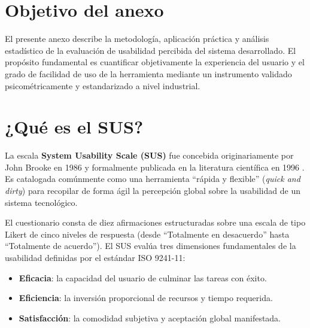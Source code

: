

\section{Objetivo del anexo}
El presente anexo describe la metodología, aplicación práctica y análisis estadístico de la evaluación de usabilidad percibida del sistema desarrollado. El propósito fundamental es cuantificar objetivamente la experiencia del usuario y el grado de facilidad de uso de la herramienta mediante un instrumento validado psicométricamente y estandarizado a nivel industrial.

\section{¿Qué es el SUS?}
La escala \textbf{System Usability Scale (SUS)} fue concebida originariamente por John Brooke en 1986 y formalmente publicada en la literatura científica en 1996 \parencite{Brooke1996}. Es catalogada comúnmente como una herramienta \enquote{rápida y flexible} (\textit{quick and dirty}) para recopilar de forma ágil la percepción global sobre la usabilidad de un sistema tecnológico.

El cuestionario consta de diez afirmaciones estructuradas sobre una escala de tipo Likert \parencite{Likert1932} de cinco niveles de respuesta (desde \enquote{Totalmente en desacuerdo} hasta \enquote{Totalmente de acuerdo}). El SUS evalúa tres dimensiones fundamentales de la usabilidad definidas por el estándar ISO 9241-11:
\begin{itemize}
    \item \textbf{Eficacia}: la capacidad del usuario de culminar las tareas con éxito.
    \item \textbf{Eficiencia}: la inversión proporcional de recursos y tiempo requerida.
    \item \textbf{Satisfacción}: la comodidad subjetiva y aceptación global manifestada.
\end{itemize}

